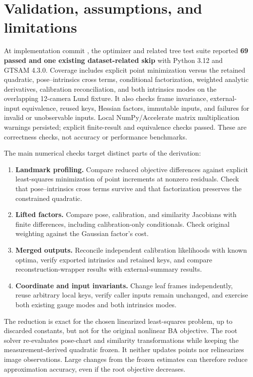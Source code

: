 \documentclass[11pt,letterpaper]{article}
\newcommand{\code}[1]{\texttt{\detokenize{#1}}}
\begin{document}
\newpage
\section{Validation, assumptions, and limitations}
At implementation commit \code{cae83707}, the optimizer and related tree test
suite reported \textbf{69 passed and one existing dataset-related skip} with
Python 3.12 and GTSAM 4.3.0. Coverage includes explicit point minimization versus
the retained quadratic, pose--intrinsics cross terms, conditional factorization,
weighted analytic derivatives, calibration reconciliation, and both intrinsics
modes on the overlapping 12-camera Lund fixture. It also checks frame invariance,
external-input equivalence, reused keys, Hessian factors, immutable inputs,
and failures for invalid or unobservable inputs. Local NumPy/Accelerate matrix
multiplication warnings persisted; explicit finite-result and equivalence checks
passed. These are correctness checks, not accuracy or performance benchmarks.

The main numerical checks target distinct parts of the derivation:
\begin{enumerate}
\item \textbf{Landmark profiling.} Compare reduced objective differences against
explicit least-squares minimization of point increments at nonzero residuals.
Check that pose--intrinsics cross terms survive and that factorization preserves
the constrained quadratic.
\item \textbf{Lifted factors.} Compare pose, calibration, and similarity
Jacobians with finite differences, including calibration-only conditionals.
Check original weighting against the Gaussian factor's cost.
\item \textbf{Merged outputs.} Reconcile independent calibration likelihoods
with known optima, verify exported intrinsics and retained keys, and compare
reconstruction-wrapper results with external-summary results.
\item \textbf{Coordinate and input invariants.} Change leaf frames independently,
reuse arbitrary local keys, verify caller inputs remain unchanged, and exercise
both existing gauge modes and both intrinsics modes.
\end{enumerate}

The reduction is exact for the chosen linearized least-squares problem,
up to discarded constants, but not for the original nonlinear BA objective.
The root solver re-evaluates pose-chart and similarity transformations while
keeping the measurement-derived quadratic frozen. It neither updates points nor
relinearizes image observations. Large changes from the frozen estimates can
therefore reduce approximation accuracy, even if the root objective decreases.
\end{document}
